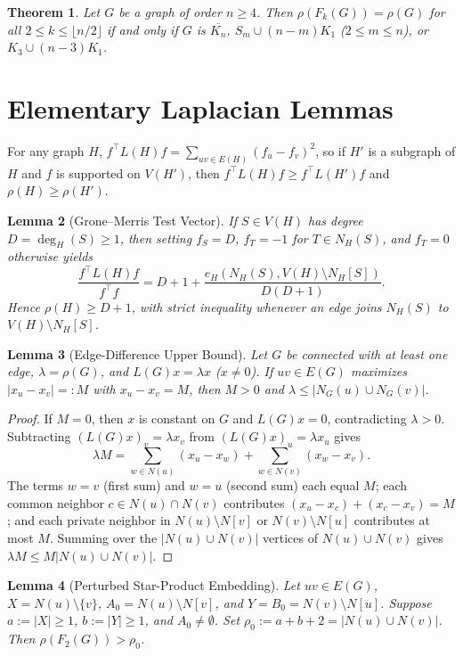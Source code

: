 \documentclass[11pt]{article}
\newtheorem{theorem}{Theorem}
\newtheorem{lemma}[theorem]{Lemma}
\begin{document}
\begin{theorem}\label{thm:all}
Let $G$ be a graph of order $n \ge 4$. Then $\rho(F_k(G)) = \rho(G)$ for all
$2 \le k \le \lfloor n/2 \rfloor$ if and only if $G$ is $\overline{K_n}$,
$S_m \cup (n - m)K_1$ ($2 \le m \le n$), or $K_3 \cup (n - 3)K_1$.
\end{theorem}

\section{Elementary Laplacian Lemmas}

For any graph $H$, $f^\top L(H) f = \sum_{uv \in E(H)} (f_u - f_v)^2$, so if
$H'$ is a subgraph of $H$ and $f$ is supported on $V(H')$, then
$f^\top L(H) f \ge f^\top L(H') f$ and $\rho(H) \ge \rho(H')$.

\begin{lemma}[Grone--Merris Test Vector]\label{lem:gm}
If $S \in V(H)$ has degree $D = \deg_H(S) \ge 1$, then setting $f_S = D$,
$f_T = -1$ for $T \in N_H(S)$, and $f_T = 0$ otherwise yields
\[
\frac{f^\top L(H) f}{f^\top f}
= D + 1 + \frac{e_H(N_H(S), V(H) \setminus N_H[S])}{D(D + 1)}.
\]
Hence $\rho(H) \ge D + 1$, with strict inequality whenever an edge joins
$N_H(S)$ to $V(H) \setminus N_H[S]$.
\end{lemma}

\begin{lemma}[Edge-Difference Upper Bound]\label{lem:edge}
Let $G$ be connected with at least one edge, $\lambda = \rho(G)$, and
$L(G)x = \lambda x$ ($x \neq 0$). If $uv \in E(G)$ maximizes
$|x_u - x_v| =: M$ with $x_u - x_v = M$, then $M > 0$ and
$\lambda \le |N_G(u) \cup N_G(v)|$.
\end{lemma}

\begin{proof}
If $M = 0$, then $x$ is constant on $G$ and $L(G)x = 0$, contradicting
$\lambda > 0$. Subtracting $(L(G)x)_v = \lambda x_v$ from
$(L(G)x)_u = \lambda x_u$ gives
\[
\lambda M
= \sum_{w \in N(u)} (x_u - x_w) + \sum_{w \in N(v)} (x_w - x_v).
\]
The terms $w = v$ (first sum) and $w = u$ (second sum) each equal $M$; each
common neighbor $c \in N(u) \cap N(v)$ contributes $(x_u - x_c) + (x_c - x_v) = M$;
and each private neighbor in $N(u) \setminus N[v]$ or $N(v) \setminus N[u]$
contributes at most $M$. Summing over the $|N(u) \cup N(v)|$ vertices of
$N(u) \cup N(v)$ gives $\lambda M \le M|N(u) \cup N(v)|$.
\end{proof}

\begin{lemma}[Perturbed Star-Product Embedding]\label{lem:prod}
Let $uv \in E(G)$, $X = N(u) \setminus \{v\}$, $A_0 = N(u) \setminus N[v]$,
and $Y = B_0 = N(v) \setminus N[u]$. Suppose $a := |X| \ge 1$,
$b := |Y| \ge 1$, and $A_0 \neq \emptyset$. Set
$\rho_0 := a + b + 2 = |N(u) \cup N(v)|$. Then $\rho(F_2(G)) > \rho_0$.
\end{lemma}
\end{document}
